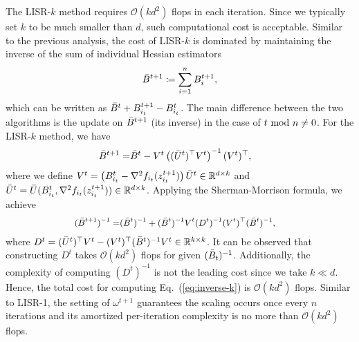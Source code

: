 \documentclass[letterpaper]{article} %
\theoremstyle{plain}
\theoremstyle{definition}
\theoremstyle{remark}
\def\BR{{\mathbb{R}}}
\def\fO{{\mathcal{O}}}
\begin{document}
The LISR-$k$ method requires $\fO(k d^2)$ flops in each iteration.
Since we typically set $k$ to be much smaller than $d$, such computational cost is acceptable.
Similar to the previous analysis, the cost of LISR-$k$ is dominated by maintaining the inverse of the sum of individual
Hessian estimators 
\begin{equation*}
    \Bar{B}^{t+1} \coloneqq \sum_{i=1}^n B_i^{t+1},
\end{equation*}
which can be written as $\Bar{B}^{t} + B_{i_t}^{t+1} - B_{i_t}^{t}$.
The main difference between the two algorithms is the update on $\Bar B^{t+1}$ (its inverse) in the case of $t~{\rm mod}~n \neq 0$. For the LISR-$k$ method, we have
\begin{equation*}
\begin{split}
        \Bar{B}^{t+1} = &\Bar{B}^{t} - V^{t} \left((\Bar{U}^{t})^{\top} V^{t}\right)^{-1} (V^{t})^{\top},
\end{split}
\end{equation*}
where we define $V^{t}=\left(B_{i_t}^{t}-\nabla^2 f_{i_{t}}(z_{i_{t}}^{t+1})\right) \Bar{U}^{t}\in\BR^{d\times k}$ and $\Bar{U}^{t}=\Bar{U}(B_{i_{t}}^{t}, \nabla^2 f_{i_{t}}(z_{i_{t}}^{t+1}))\in\BR^{d\times k}$. Applying the Sherman-Morrison formula, we achieve
\begin{equation}\label{eq:inverse-k}\small
\begin{split}
    (\Bar{B}^{t+1})^{-1} = & (\Bar{B}^{t})^{-1} + (\Bar{B}^{t})^{-1}  V^{t} (D^{t})^{-1} (V^{t})^{\top} (\Bar{B}^{t})^{-1},
\end{split}
\end{equation}
where $D^{t} = (\Bar{U}^{t})^{\top} V^{t} -  (V^{t})^{\top} (\Bar{B}^{t})^{-1} V^{t}\in\BR^{k\times k}$. 
It can be observed that constructing $D^t$ takes $\fO(k d^2)$ flops for given $(\Bar B_t)^{-1}$. 
Additionally, the complexity of computing $(D^t)^{-1}$ is not the leading cost since we take $k\ll d$.
Hence, the total cost for computing Eq.~(\ref{eq:inverse-k}) is $\fO(k d^2)$ flops.
Similar to LISR-1, the setting of $\omega^{t+1}$ guarantees the scaling occurs once every $n$ iterations and its amortized per-iteration complexity is no more than $\fO(k d^2)$ flops.

\end{document}

